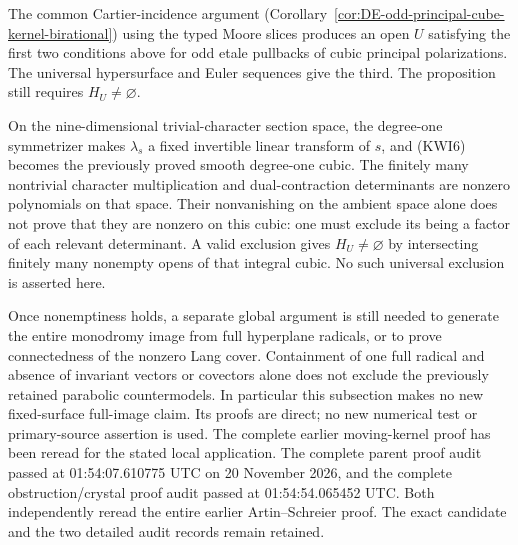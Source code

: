 \begin{remark}
\label{rem:Cartier-kernel-wall-inertia-scope}
The common Cartier-incidence argument
(Corollary~\ref{cor:DE-odd-principal-cube-kernel-birational})
using the typed Moore slices
produces an open \(U\) satisfying the first two conditions above
for odd etale pullbacks of cubic principal polarizations.  The
universal hypersurface and Euler sequences give the third.  The
proposition still requires \(H_U\ne\varnothing\).

On the nine-dimensional trivial-character section space, the
degree-one symmetrizer makes \(\lambda_s\) a fixed invertible
linear transform of \(s\), and (KWI6) becomes the previously
proved smooth degree-one cubic.  The finitely many nontrivial
character multiplication and dual-contraction determinants are
nonzero polynomials on that space.  Their nonvanishing on the
ambient space alone does not prove that they are nonzero on this
cubic: one must exclude its being a factor of each relevant
determinant.  A valid exclusion gives \(H_U\ne\varnothing\)
by intersecting finitely many nonempty opens of that integral
cubic.  No such universal exclusion is asserted here.

Once nonemptiness holds, a separate global argument is still needed
to generate the entire monodromy image from full hyperplane
radicals, or to prove connectedness of the nonzero Lang cover.
Containment of one full radical and absence of invariant vectors
or covectors alone does not exclude the previously retained
parabolic countermodels.  In particular this subsection makes no
new fixed-surface full-image claim.  Its proofs are direct; no new
numerical test or primary-source assertion is used.  The complete
earlier moving-kernel proof has been reread for the stated local
application.  The complete parent proof audit passed at
01:54:07.610775 UTC on 20 November 2026, and the complete
obstruction/crystal proof audit passed at 01:54:54.065452 UTC.
Both independently reread the entire earlier Artin--Schreier proof.
The exact candidate and the two detailed audit records remain retained.
\end{remark}
